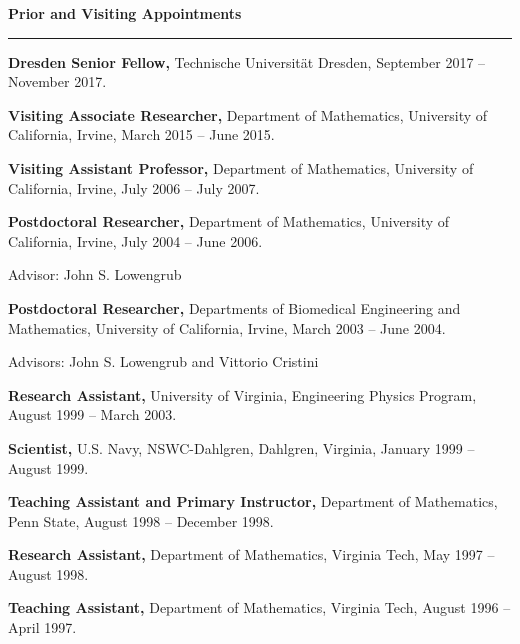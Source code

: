 \documentclass[10pt,letterpaper]{article}
\newcommand{\cvsection}[1]{%
  \Needspace{5\baselineskip}\par\vspace{13pt}%
  {\color{Smokey}\fontsize{15}{17}\selectfont\bfseries #1}\par\vspace{3pt}%
  {\color{UTOrange}\rule{\linewidth}{1.8pt}}\par\vspace{4pt}%
}
\begin{document}
	\smallskip

\cvsection{Prior and Visiting Appointments}
    \begin{description}    \item 
\textbf{Dresden Senior Fellow,} Technische Universit\"{a}t Dresden, September 2017 -- November 2017.
    \item 
\textbf{Visiting Associate Researcher,} Department of Mathematics, University of California, Irvine, March 2015 -- June 2015.
    \item 
\textbf{Visiting Assistant Professor,} Department of Mathematics, University of California, Irvine, July 2006 -- July 2007.
    \item 
\textbf{Postdoctoral Researcher,} Department of Mathematics, University of California, Irvine, July 2004 -- June 2006.
    \begin{description}
    \item
Advisor: John S. Lowengrub
    \end{description}
    	\item 
\textbf{Postdoctoral Researcher,} Departments of Biomedical Engineering and Mathematics, University of California, Irvine, March 2003 -- June 2004.
    \begin{description}
    \item
Advisors: John S. Lowengrub and Vittorio Cristini
    \end{description}
	\item
\textbf{Research Assistant,} University of Virginia, Engineering Physics Program, August 1999 -- March 2003.
    \item
\textbf{Scientist,} U.S. Navy, NSWC-Dahlgren, Dahlgren, Virginia, January 1999 -- August 1999.
    \item
\textbf{Teaching Assistant and Primary Instructor,} Department of Mathematics, Penn State, August 1998 -- December 1998.
    \item
\textbf{Research Assistant,} Department of Mathematics, Virginia Tech, May 1997 -- August 1998.
    \item
\textbf{Teaching Assistant,} Department of Mathematics, Virginia Tech, August 1996 -- April 1997.
    \end{description}
\end{document}
